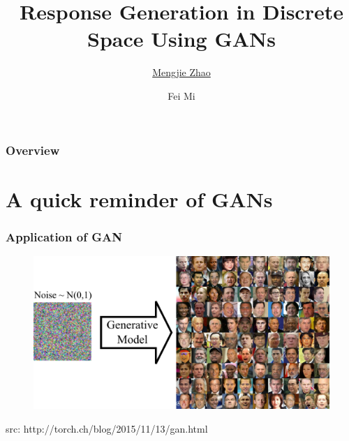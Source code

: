 \documentclass{beamer}
\title[\tiny{Response in Discrete Space GANs}]{Response Generation in Discrete Space Using GANs} %
\author[M. Zhao et F. Mi]{\underline{Mengjie Zhao}  \and Fei Mi } %
\institute[] %
{
\footnotesize{Artificial Intelligence Laboratory (LIA)}
\date{\today}
\\\medskip
\medskip
\medskip
\medskip
\medskip
\medskip
\medskip
\vspace{-1cm}
\begin{figure}
\texttt{[image: imgs/epfl1.eps]}
\end{figure}
}
\begin{document}
\begin{frame}
\titlepage %
\end{frame}

\begin{frame}
\frametitle{Overview} %
\tableofcontents %
\end{frame}


\section{A quick reminder of GANs} %

\begin{frame}
\frametitle{Application of GAN}
\begin{figure}
\includegraphics[width=0.8\linewidth]{imgs/w1_g_model.png}
\end{figure}
\hspace{7cm}\tiny{src: http://torch.ch/blog/2015/11/13/gan.html}
\end{frame}
\end{document}
